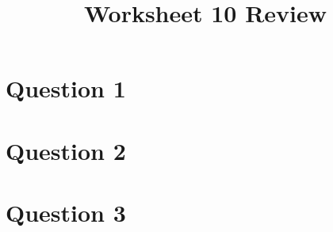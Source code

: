 \documentclass[12pt]{article}
\begin{document}
\title{Worksheet 10 Review}
\maketitle

\section*{Question 1}

\section*{Question 2}

\section*{Question 3}
\end{document}
